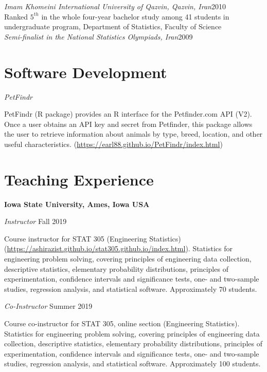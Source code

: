 \documentclass[margin,line]{res}
\begin{document}
\begin{resume}
{\em Imam Khomeini International University of Qazvin, Qazvin, Iran}\hfill 2010\\
Ranked $5^{th}$ in the whole four-year bachelor study among 41 students in undergraduate program, Department of Statistics, Faculty of Science\\

{\em Semi-finalist in the National Statistics Olympiads, Iran}\hfill 2009


\section{\sc Software Development}


{\em PetFindr}

\vspace{-.3cm}
PetFindr (R package) provides an R interface for the Petfinder.com API (V2). Once a user obtains an API key and secret from Petfinder, this package allows the user to retrieve information about animals by type, breed, location, and other useful characteristics. (\url{https://earl88.github.io/PetFindr/index.html})



\section{\sc Teaching Experience}

{\bf Iowa State University, Ames, Iowa USA}

{\em Instructor} \hfill { Fall 2019}

\vspace{-.3cm}
Course instructor for STAT 305 (Engineering Statistics) (\url{https://ashirazist.github.io/stat305.github.io/index.html}). Statistics for engineering problem solving, covering principles of engineering data collection, descriptive statistics, elementary probability distributions, principles of experimentation, confidence intervals and significance tests, one- and two-sample studies, regression analysis, and statistical software. Approximately 70 students.

{\em Co-Instructor} \hfill { Summer 2019}

\vspace{-.3cm}
Course co-instructor for STAT 305, online section (Engineering Statistics). Statistics for engineering problem solving, covering principles of engineering data collection, descriptive statistics, elementary probability distributions, principles of experimentation, confidence intervals and significance tests, one- and two-sample studies, regression analysis, and statistical software. Approximately 100 students.


\end{resume}
\end{document}
